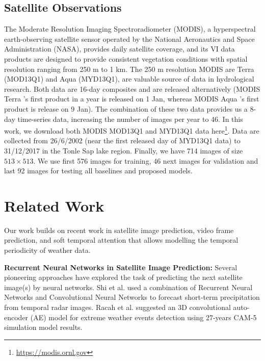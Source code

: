 \subsection{Satellite Observations}
\label{subsection-used-data}
The Moderate Resolution Imaging Spectroradiometer (MODIS), a hyperspectral earth-observing satellite sensor operated by the National Aeronautics and Space Administration (NASA), provides daily satellite coverage, and its VI data products are designed to provide consistent vegetation conditions with spatial resolution ranging from 250 m to 1 km. The 250 m resolution MODIS are Terra (MOD13Q1) and Aqua (MYD13Q1), are valuable source of data in hydrological research. Both data are 16-day composites and are released alternatively (MODIS Terra 's first product in a year is released on 1 Jan, whereas MODIS Aqua 's first product is release on 9 Jan). The combination of these two data provides us a 8-day time-series data, increasing the number of images per year to 46. In this work, we download both MODIS MOD13Q1 and MYD13Q1 data here\footnote{\url{https://modis.ornl.gov}}. Data are collected from 26/6/2002 (near the first released day of MYD13Q1 data) to 31/12/2017 in the Tonle Sap lake region. Finally, we have 714 images of size $513 \times 513$. We use first 576 images for training, 46 next images for validation and last 92 images for testing all baselines and proposed models.
 
\section{Related Work}
Our work builds on recent work in satellite image prediction, video frame prediction, and soft temporal attention that allows modelling the temporal periodicity of weather data.

\textbf{Recurrent Neural Networks in Satellite Image Prediction:} Several pioneering approaches have explored the task of predicting the next satellite image(s) by neural networks. Shi et al. \cite{Shi2015ConvolutionalLN} used a combination of Recurrent Neural Networks and Convolutional Neural Networks to forecast short-term precipitation from temporal radar images. Racah et al. \cite{DBLP:journals/corr/RacahBMPP16} suggested an 3D convolutional auto-encoder (AE) model for extreme weather events detection using 27-years CAM-5 simulation model results.

